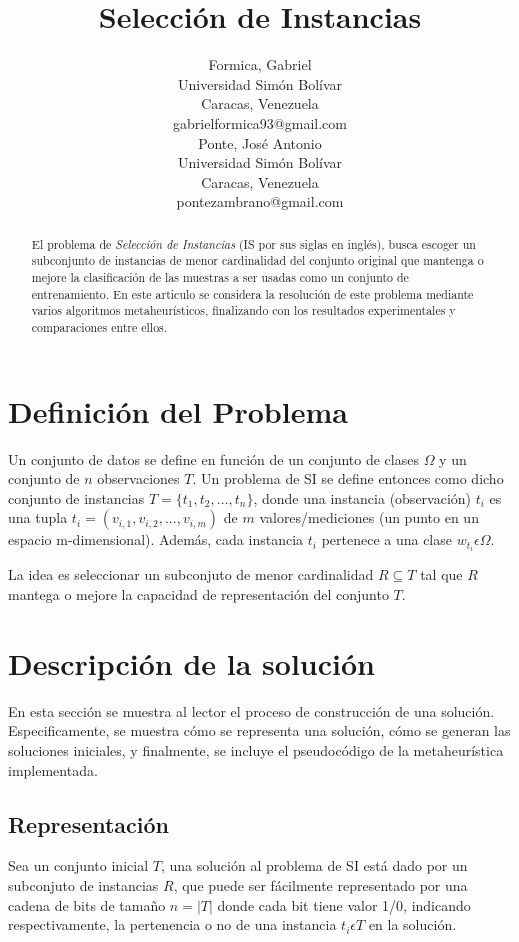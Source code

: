\documentclass[11pt]{article}
\title{Selección de Instancias}
\author{Formica, Gabriel\\
  Universidad Simón Bolívar\\
  Caracas, Venezuela\\
  {gabrielformica93@gmail.com} \\\And
  Ponte, José Antonio\\
  Universidad Simón Bolívar\\
  Caracas, Venezuela\\
  {pontezambrano@gmail.com} \\}
\date{}
\begin{document}
\maketitle
\begin{abstract}
  El problema de \textit{Selección de Instancias} (IS por sus siglas en inglés), busca
  escoger un subconjunto de instancias de menor cardinalidad del conjunto original
  que mantenga o mejore la clasificación de las muestras a ser usadas como un conjunto
  de entrenamiento. En este articulo se considera la resolución de este problema
  mediante varios algoritmos metaheurísticos, finalizando con los resultados 
  experimentales y comparaciones entre ellos.
\end{abstract}

\section{Definición del Problema}

Un conjunto de datos se define en función de un conjunto de clases $\Omega$ y
un conjunto de $n$ observaciones $T$. Un problema de SI se define entonces como dicho 
conjunto de instancias 
$T = \{t_{1}, t_{2},..., t_{n}\}$, donde una instancia (observación) $t_{i}$ es
una tupla $t_{i} = (v_{i,1}, v_{i,2},...,v_{i,m})$ de $m$ valores/mediciones
(un punto en un espacio m-dimensional). Además, cada instancia $t_{i}$
pertenece a una clase $w_{t_{i}}  \epsilon  \Omega$. 

La idea es seleccionar un subconjuto de menor cardinalidad 
$R \subseteq T$ tal que $R$ mantega o mejore la capacidad 
de representación del conjunto $T$.

\section{Descripción de la solución}

En esta sección se muestra al lector el proceso de construcción de una 
solución. Especificamente, se muestra cómo se representa una solución,
cómo se generan las soluciones iniciales, y finalmente, se incluye 
el pseudocódigo de la metaheurística implementada.

\subsection{Representación}

Sea un conjunto inicial $T$, una solución al problema de SI está
dado por un subconjuto de instancias $R$,
que puede ser fácilmente representado por una cadena de bits de 
tamaño $n = |T|$ donde cada bit tiene valor 1/0, indicando respectivamente,
la pertenencia o no de una instancia $t_{i} \epsilon T$ en la solución. 
\end{document}
